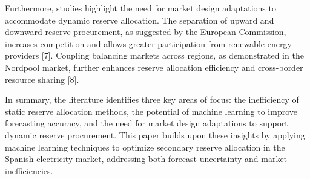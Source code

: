 Furthermore, studies highlight the need for market design adaptations to accommodate dynamic reserve allocation. The separation of upward and downward reserve procurement, as suggested by the European Commission, increases competition and allows greater participation from renewable energy providers [7]. Coupling balancing markets across regions, as demonstrated in the Nordpool market, further enhances reserve allocation efficiency and cross-border resource sharing [8].\par
In summary, the literature identifies three key areas of focus: the inefficiency of static reserve allocation methods, the potential of machine learning to improve forecasting accuracy, and the need for market design adaptations to support dynamic reserve procurement. This paper builds upon these insights by applying machine learning techniques to optimize secondary reserve allocation in the Spanish electricity market, addressing both forecast uncertainty and market inefficiencies.\par